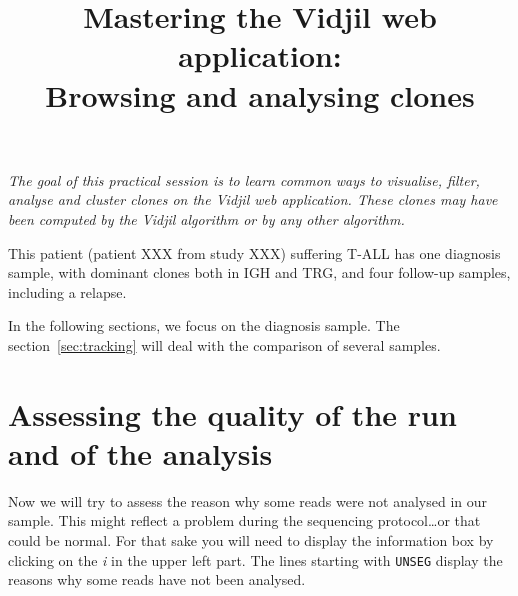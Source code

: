 \documentclass[11pt]{article}
\title{Mastering the Vidjil web application:\\ Browsing and analysing clones}
\begin{document}
\maketitle

\textit{The goal of this practical session is to learn
common ways to visualise, filter, analyse and cluster clones
on the Vidjil web application.
%
These clones may have been computed by the Vidjil algorithm or by any other algorithm.}

\bigskip


This patient (patient XXX from study XXX) suffering T-ALL has one diagnosis sample,
with dominant clones both in IGH and TRG,
and four follow-up samples, including a relapse.


In the following sections, we focus on the diagnosis sample.
The section~\ref{sec:tracking} will deal with the comparison of several samples. 

\section{Assessing the quality of the run and of the analysis}



Now we will try to assess the reason why some reads were not analysed in our
sample.
This might reflect a problem during the sequencing protocol\dots or that could
be normal.
For that sake you will need to display the information box by clicking on the
\textit{i} in the upper left part.
The lines starting with \texttt{UNSEG} display the reasons why some reads have
not been analysed.
\end{document}
